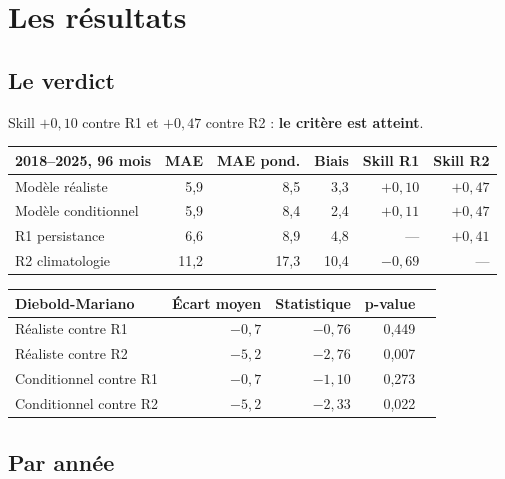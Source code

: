 \documentclass[11pt,a4paper]{article}
\begin{document}
\section{Les résultats}

\subsection{Le verdict}

Skill $+0{,}10$ contre R1 et $+0{,}47$ contre R2 : \textbf{le critère est atteint}.

\begin{center}
\begin{tabular}{lrrrrr}
\toprule
\textbf{2018--2025, 96 mois} & MAE & MAE pond. & Biais & Skill R1 & Skill R2 \\
\midrule
Modèle réaliste & 5,9 & 8,5 & 3,3 & $+0{,}10$ & $+0{,}47$ \\
Modèle conditionnel & 5,9 & 8,4 & 2,4 & $+0{,}11$ & $+0{,}47$ \\
R1 persistance & 6,6 & 8,9 & 4,8 & --- & $+0{,}41$ \\
R2 climatologie & 11,2 & 17,3 & 10,4 & $-0{,}69$ & --- \\
\bottomrule
\end{tabular}
\end{center}

\begin{center}
\begin{tabular}{lrrrr}
\toprule
\textbf{Diebold-Mariano} & Écart moyen & Statistique & p-value \\
\midrule
Réaliste contre R1 & $-0{,}7$ & $-0{,}76$ & 0,449 \\
Réaliste contre R2 & $-5{,}2$ & $-2{,}76$ & 0,007 \\
Conditionnel contre R1 & $-0{,}7$ & $-1{,}10$ & 0,273 \\
Conditionnel contre R2 & $-5{,}2$ & $-2{,}33$ & 0,022 \\
\bottomrule
\end{tabular}
\end{center}

\subsection{Par année}
\end{document}
